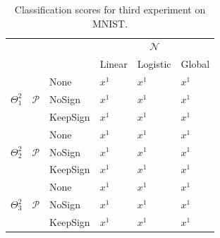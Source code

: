 \documentclass[12pt,a4paper,oneside,english]{UPBThesis}
\begin{document}
\renewcommand{\arraystretch}{1.2}
\begin{table}
  \caption{Classification scores for third experiment on MNIST.}
  \label{table:RecoderEvMNISTSmallResultsNP}
  \begin{tabularx}{\textwidth}{ccR|RRR|}
    & & &  \tabularnewline
    & & & Linear & Logistic & Global \tabularnewline\hline
     &  & None & $x^1$ & $x^1$ & $x^1$ \tabularnewline
     &  & NoSign & $x^1$ & $x^1$ & $x^1$ \tabularnewline
     &  & KeepSign & $x^1$ & $x^1$ & $x^1$ \tabularnewline\hline\hline
     &  & None & $x^1$ & $x^1$ & $x^1$ \tabularnewline
     &  & NoSign & $x^1$ & $x^1$ & $x^1$ \tabularnewline
     &  & KeepSign & $x^1$ & $x^1$ & $x^1$ \tabularnewline\hline\hline
     &  & None & $x^1$ & $x^1$ & $x^1$ \tabularnewline
     &  & NoSign & $x^1$ & $x^1$ & $x^1$ \tabularnewline
     &  & KeepSign & $x^1$ & $x^1$ & $x^1$ \tabularnewline\hline
  \end{tabularx}
\end{table}
\renewcommand{\arraystretch}{1.0}
\end{document}
